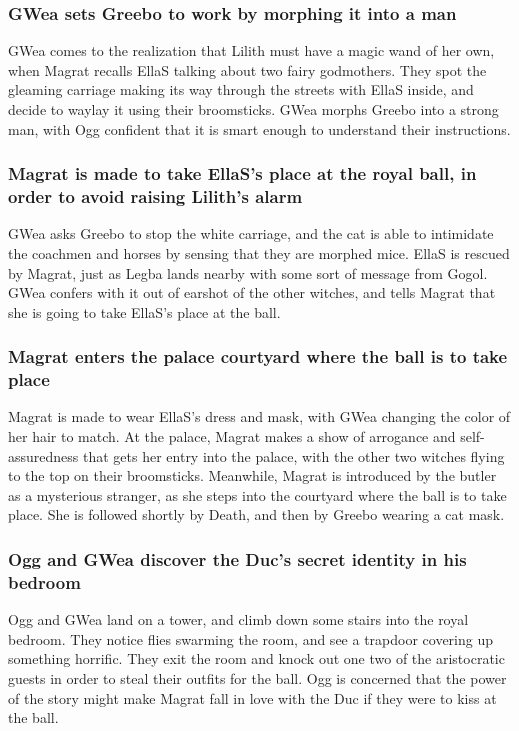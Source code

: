 \subsubsection{\Gls{GWea} sets \Gls{Greebo} to work by morphing it into a man}
\Gls{GWea} comes to the realization that \Gls{Lilith} must have a magic wand of her own, when
\Gls{Magrat} recalls \Gls{EllaS} talking about two fairy godmothers. They spot the gleaming carriage
making its way through the streets with \Gls{EllaS} inside, and decide to waylay it using their
broomsticks. \Gls{GWea} morphs \Gls{Greebo} into a strong man, with \Gls{Ogg} confident that it is
smart enough to understand their instructions.

\subsubsection{\Gls{Magrat} is made to take \Gls{EllaS}'s place at the royal ball, in order to
    avoid raising \Gls{Lilith}'s alarm}
\Gls{GWea} asks \Gls{Greebo} to stop the white carriage, and the cat is able to intimidate the
coachmen and horses by sensing that they are morphed mice. \Gls{EllaS} is rescued by \Gls{Magrat},
just as \Gls{Legba} lands nearby with some sort of message from \Gls{Gogol}. \Gls{GWea} confers with
it out of earshot of the other witches, and tells \Gls{Magrat} that she is going to take
\Gls{EllaS}'s place at the ball.

\subsubsection{\Gls{Magrat} enters the palace courtyard where the ball is to take place}
\Gls{Magrat} is made to wear \Gls{EllaS}'s dress and mask, with \Gls{GWea} changing the color of
her hair to match. At the palace, \Gls{Magrat} makes a show of arrogance and self-assuredness that
gets her entry into the palace, with the other two witches flying to the top on their broomsticks.
Meanwhile, \Gls{Magrat} is introduced by the butler as a mysterious stranger, as she steps into the
courtyard where the ball is to take place. She is followed shortly by \Gls{Death}, and then by
\Gls{Greebo} wearing a cat mask.

\subsubsection{\Gls{Ogg} and \Gls{GWea} discover the \Gls{Duc}'s secret identity in his bedroom}
\Gls{Ogg} and \Gls{GWea} land on a tower, and climb down some stairs into the royal bedroom. They
notice flies swarming the room, and see a trapdoor covering up something horrific. They exit the
room and knock out one two of the aristocratic guests in order to steal their outfits for the ball.
\Gls{Ogg} is concerned that the power of the story might make \Gls{Magrat} fall in love with the
\Gls{Duc} if they were to kiss at the ball.

